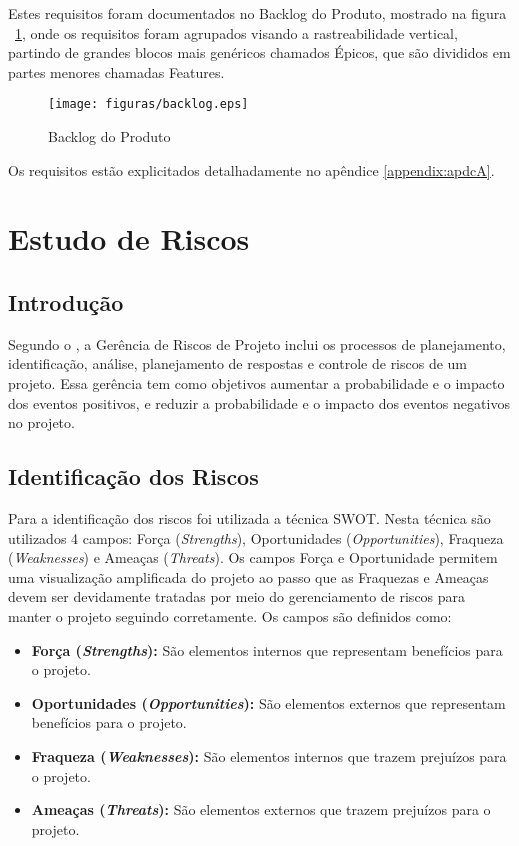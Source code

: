 Estes requisitos foram documentados no Backlog do Produto, mostrado na figura ~\ref{fig:backlog}, onde os requisitos foram agrupados visando a rastreabilidade vertical, partindo de grandes blocos mais genéricos chamados Épicos, que são divididos em partes menores chamadas Features.

\begin{figure}[!h]
  \centering
  	\texttt{[image: figuras/backlog.eps]}
   \caption{Backlog do Produto\label{fig:backlog}}
\end{figure}

Os requisitos estão explicitados detalhadamente no apêndice \ref{appendix:apdcA}.

\chapter{Estudo de Riscos}
\section{Introdução}
Segundo o \cite{pmbok}  , a Gerência de Riscos de Projeto inclui os processos de planejamento, identificação,
análise, planejamento de respostas e controle de riscos de um projeto. Essa gerência tem como objetivos aumentar a
probabilidade e o impacto dos eventos positivos, e reduzir a probabilidade e o impacto dos eventos negativos no projeto.

\section{Identificação dos Riscos}
Para a identificação dos riscos foi utilizada a técnica SWOT. Nesta técnica são utilizados 4 campos: Força (\textit{Strengths}),
 Oportunidades (\textit{Opportunities}), Fraqueza (\textit{Weaknesses}) e Ameaças (\textit{Threats}). Os campos Força e Oportunidade permitem uma
 visualização amplificada do projeto ao passo que as Fraquezas e Ameaças devem ser devidamente tratadas por meio do
 gerenciamento de riscos para manter o projeto seguindo corretamente. Os campos são definidos como:

\begin{itemize}
  \item \textbf{Força (\textit{Strengths}):} São elementos internos que representam benefícios para o projeto.
  \item \textbf{Oportunidades (\textit{Opportunities}):} São elementos externos que representam benefícios para o projeto.
  \item \textbf{Fraqueza (\textit{Weaknesses}):} São elementos internos que trazem prejuízos para o projeto.
  \item \textbf{Ameaças (\textit{Threats}):} São elementos externos que trazem prejuízos para o projeto.
\end{itemize}

